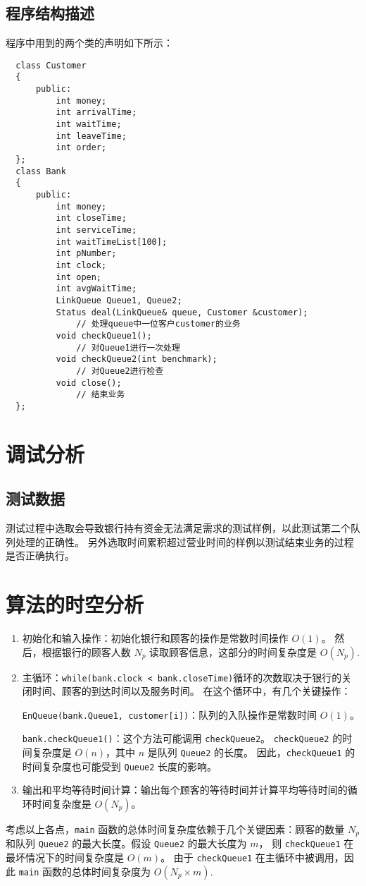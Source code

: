 \documentclass[UTF8]{ctexart}
\begin{document}
\subsection{程序结构描述}
程序中用到的两个类的声明如下所示：
\begin{lstlisting}
  class Customer
  {
      public:
          int money;
          int arrivalTime;
          int waitTime;
          int leaveTime;
          int order;
  };
  class Bank
  {
      public:
          int money;
          int closeTime;
          int serviceTime;
          int waitTimeList[100];
          int pNumber;
          int clock;
          int open;
          int avgWaitTime;
          LinkQueue Queue1, Queue2;
          Status deal(LinkQueue& queue, Customer &customer);    
              // 处理queue中一位客户customer的业务
          void checkQueue1();                                 
              // 对Queue1进行一次处理
          void checkQueue2(int benchmark);                    
              // 对Queue2进行检查
          void close();                                       
              // 结束业务
  };
\end{lstlisting}

\section{调试分析}
\subsection{测试数据}
测试过程中选取会导致银行持有资金无法满足需求的测试样例，以此测试第二个队列处理的正确性。
另外选取时间累积超过营业时间的样例以测试结束业务的过程是否正确执行。

\section{算法的时空分析}
\begin{enumerate}
  \item 初始化和输入操作：初始化银行和顾客的操作是常数时间操作 $O(1)$。
  然后，根据银行的顾客人数 $N_p$ 读取顾客信息，这部分的时间复杂度是 $O(N_p)$.
  \item 主循环：\lstinline{while(bank.clock < bank.closeTime)}循环的次数取决于银行的关闭时间、顾客的到达时间以及服务时间。
  在这个循环中，有几个关键操作：
 
  \lstinline{EnQueue(bank.Queue1, customer[i])}：队列的入队操作是常数时间 $O(1)$。

  \lstinline{bank.checkQueue1()}：这个方法可能调用 \lstinline{checkQueue2}。
  \lstinline{checkQueue2} 的时间复杂度是 $O(n)$，其中 $n$ 是队列 \lstinline{Queue2} 的长度。
  因此，\lstinline{checkQueue1} 的时间复杂度也可能受到 \lstinline{Queue2} 长度的影响。
  \item 输出和平均等待时间计算：输出每个顾客的等待时间并计算平均等待时间的循环时间复杂度是 $O(N_p)$。
\end{enumerate}
考虑以上各点，\lstinline{main} 函数的总体时间复杂度依赖于几个关键因素：顾客的数量 $N_p$
和队列 \lstinline{Queue2} 的最大长度。假设 \lstinline{Queue2} 的最大长度为 $m$，
则 \lstinline{checkQueue1} 在最坏情况下的时间复杂度是 $O(m)$。
由于 \lstinline{checkQueue1} 在主循环中被调用，因此 \lstinline{main} 函数的总体时间复杂度为 $O(N_p \times m)$.
\end{document}
